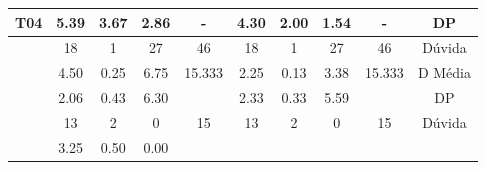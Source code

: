 \begin{table}[htbp]
\begin{tabular}{|cccccccccc}
		\multicolumn{1}{|c|}{\multirow{-3}{*}{\cellcolor[HTML]{F2F2F2}\textbf{T04}}} &
		\multicolumn{1}{c|}{5.39} &
		\multicolumn{1}{c|}{3.67} &
		\multicolumn{1}{c|}{2.86} &
		\multicolumn{1}{c|}{-} &
		\multicolumn{1}{c|}{4.30} &
		\multicolumn{1}{c|}{2.00} &
		\multicolumn{1}{c|}{1.54} &
		\multicolumn{1}{c|}{-} &
		\multicolumn{1}{c|}{DP} \\ \hline
		\rowcolor[HTML]{D9D9D9} 
		\multicolumn{1}{|c|}{\cellcolor[HTML]{F2F2F2}} &
		\multicolumn{1}{c|}{\cellcolor[HTML]{D9D9D9}18} &
		\multicolumn{1}{c|}{\cellcolor[HTML]{D9D9D9}1} &
		\multicolumn{1}{c|}{\cellcolor[HTML]{D9D9D9}27} &
		\multicolumn{1}{c|}{\cellcolor[HTML]{D9D9D9}46} &
		\multicolumn{1}{c|}{\cellcolor[HTML]{D9D9D9}18} &
		\multicolumn{1}{c|}{\cellcolor[HTML]{D9D9D9}1} &
		\multicolumn{1}{c|}{\cellcolor[HTML]{D9D9D9}27} &
		\multicolumn{1}{c|}{\cellcolor[HTML]{D9D9D9}46} &
		\multicolumn{1}{c|}{\cellcolor[HTML]{D9D9D9}Dúvida} \\ \cline{2-10} 
		\multicolumn{1}{|c|}{\cellcolor[HTML]{F2F2F2}} &
		\multicolumn{1}{c|}{4.50} &
		\multicolumn{1}{c|}{0.25} &
		\multicolumn{1}{c|}{6.75} &
		\multicolumn{1}{c|}{15.333} &
		\multicolumn{1}{c|}{2.25} &
		\multicolumn{1}{c|}{0.13} &
		\multicolumn{1}{c|}{3.38} &
		\multicolumn{1}{c|}{15.333} &
		\multicolumn{1}{c|}{D Média} \\ \cline{2-10} 
		\rowcolor[HTML]{D9D9D9} 
		\multicolumn{1}{|c|}{\multirow{-3}{*}{\cellcolor[HTML]{F2F2F2}\textbf{T05}}} &
		\multicolumn{1}{c|}{\cellcolor[HTML]{D9D9D9}2.06} &
		\multicolumn{1}{c|}{\cellcolor[HTML]{D9D9D9}0.43} &
		\multicolumn{1}{c|}{\cellcolor[HTML]{D9D9D9}6.30} &
		\multicolumn{1}{c|}{\cellcolor[HTML]{D9D9D9}} &
		\multicolumn{1}{c|}{\cellcolor[HTML]{D9D9D9}2.33} &
		\multicolumn{1}{c|}{\cellcolor[HTML]{D9D9D9}0.33} &
		\multicolumn{1}{c|}{\cellcolor[HTML]{D9D9D9}5.59} &
		\multicolumn{1}{c|}{\cellcolor[HTML]{D9D9D9}} &
		\multicolumn{1}{c|}{\cellcolor[HTML]{D9D9D9}DP} \\ \hline
		\multicolumn{1}{|c|}{\cellcolor[HTML]{F2F2F2}} &
		\multicolumn{1}{c|}{13} &
		\multicolumn{1}{c|}{2} &
		\multicolumn{1}{c|}{0} &
		\multicolumn{1}{c|}{15} &
		\multicolumn{1}{c|}{13} &
		\multicolumn{1}{c|}{2} &
		\multicolumn{1}{c|}{0} &
		\multicolumn{1}{c|}{15} &
		\multicolumn{1}{c|}{Dúvida} \\ \cline{2-10} 
		\rowcolor[HTML]{D9D9D9} 
		\multicolumn{1}{|c|}{\cellcolor[HTML]{F2F2F2}} &
		\multicolumn{1}{c|}{\cellcolor[HTML]{D9D9D9}3.25} &
		\multicolumn{1}{c|}{\cellcolor[HTML]{D9D9D9}0.50} &
		\multicolumn{1}{c|}{\cellcolor[HTML]{D9D9D9}0.00} &

\end{tabular}
\end{table}
